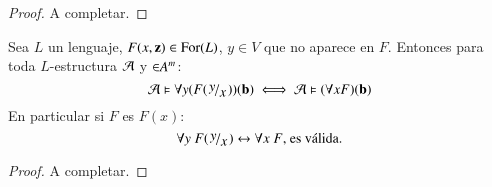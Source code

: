 \begin{proof}
    A completar. %
\end{proof}

\begin{cor}
    Sea $L$ un lenguaje, $F(x, \mathbf{z}) \in \mathrm{For}(L)$, $y \in V$ que no aparece en $F$. Entonces para toda $L$-estructura $\mathcal{A}$ y $\mathbf{\in} A^m$:
    $$
        \mtc A \vDash \forall y (F(\quo{y}{x}))(\mbf b) \iff \mtc A \vDash (\forall x F)(\mbf b)
    $$
    En particular si $F$ es $F(x)$:
    $$
        \forall y\ F(\quo{y}{x}) \bicond \forall x\ F \text{, es válida.}
    $$
\end{cor}
\begin{proof}
    A completar. %
\end{proof}
